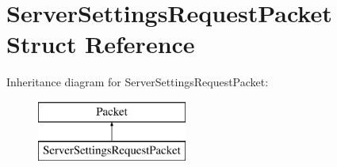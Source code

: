 \hypertarget{struct_server_settings_request_packet}{}\section{Server\+Settings\+Request\+Packet Struct Reference}
\label{struct_server_settings_request_packet}
Inheritance diagram for Server\+Settings\+Request\+Packet\+:\begin{figure}[H]
\begin{center}
\leavevmode
\includegraphics[height=2.000000cm]{struct_server_settings_request_packet}
\end{center}
\end{figure}

